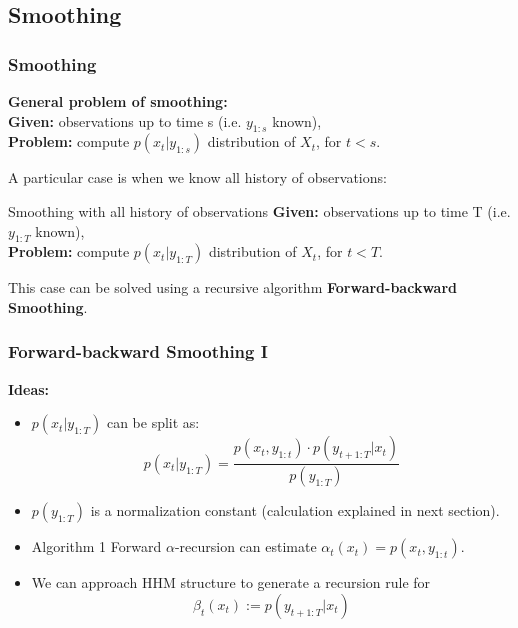 \documentclass[xcolor=dvipsnames, compress]{beamer}
\begin{document}
\begin{frame}
\section{Smoothing}


\frametitle{Smoothing}

\textbf{General problem of smoothing:}\\
\textbf{Given:} observations up to time s (i.e. $y_{1:s}$ known),\\
\textbf{Problem:} compute $p(x_t | y_{1:s})$ distribution of $X_t$, for $t < s$.
\vspace{0.5cm}

A particular case is when we know all history of observations:

\begin{block}{Smoothing with all history of observations}
	\textbf{Given:} observations up to time T (i.e. $y_{1:T}$ known),\\
	\textbf{Problem:} compute $p(x_t | y_{1:T})$ distribution of $X_t$, for $t < T$.
\end{block}

This case can be solved using a recursive algorithm \textbf{Forward-backward Smoothing}.

\end{frame}


\begin{frame}
\frametitle{Forward-backward Smoothing I}

\textbf{Ideas:}

\begin{itemize}
\item  $p(x_t |y_{1:T})$ can be split as:
$$p(x_t |y_{1:T}) = \frac{p(x_t , y_{1:t} ) \cdot p(y_{t+1:T} |x_t )}
	{p(y_{1:T})}$$
	
\item $p(y_{1:T})$ is a normalization constant (calculation explained in next section).
	
\item Algorithm 1 Forward $\alpha$-recursion can estimate $\alpha_t(x_t)=p(x_t , y_{1:t} )$.

\item We can approach HHM structure to generate a recursion rule for $$\beta_t(x_t):=p(y_{t+1:T} |x_t )$$

\end{itemize}

\end{frame}
\end{document}
